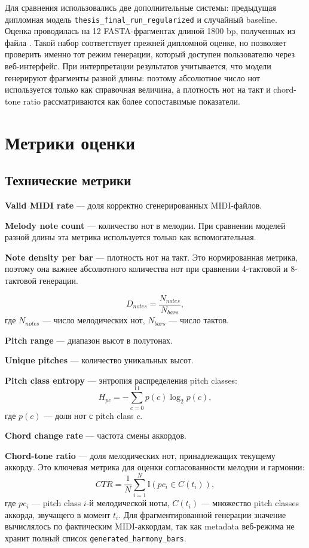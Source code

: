 Для сравнения использовались две дополнительные системы: предыдущая дипломная модель \texttt{thesis\_final\_run\_regularized} и случайный baseline. Оценка проводилась на 12 FASTA-фрагментах длиной 1800 bp, полученных из файла . Такой набор соответствует прежней дипломной оценке, но позволяет проверить именно тот режим генерации, который доступен пользователю через веб-интерфейс. При интерпретации результатов учитывается, что модели генерируют фрагменты разной длины: поэтому абсолютное число нот используется только как справочная величина, а плотность нот на такт и chord-tone ratio рассматриваются как более сопоставимые показатели.

\section{Метрики оценки}

\subsection{Технические метрики}

\textbf{Valid MIDI rate} — доля корректно сгенерированных MIDI-файлов.

\textbf{Melody note count} — количество нот в мелодии. При сравнении моделей разной длины эта метрика используется только как вспомогательная.

\textbf{Note density per bar} — плотность нот на такт. Это нормированная метрика, поэтому она важнее абсолютного количества нот при сравнении 4-тактовой и 8-тактовой генерации.

\begin{equation}
D_{notes} = \frac{N_{notes}}{N_{bars}},
\end{equation}
где \(N_{notes}\) — число мелодических нот, \(N_{bars}\) — число тактов.

\textbf{Pitch range} — диапазон высот в полутонах.

\textbf{Unique pitches} — количество уникальных высот.

\textbf{Pitch class entropy} — энтропия распределения pitch classes:
\begin{equation}
H_{pc} = - \sum_{c=0}^{11} p(c)\log_2 p(c),
\end{equation}
где \(p(c)\) — доля нот с pitch class \(c\).

\textbf{Chord change rate} — частота смены аккордов.

\textbf{Chord-tone ratio} — доля мелодических нот, принадлежащих текущему аккорду. Это ключевая метрика для оценки согласованности мелодии и гармонии:
\begin{equation}
CTR = \frac{1}{N}\sum_{i=1}^{N}
\mathbb{I}\left(pc_i \in C(t_i)\right),
\end{equation}
где \(pc_i\) — pitch class \(i\)-й мелодической ноты, \(C(t_i)\) — множество pitch classes аккорда, звучащего в момент \(t_i\). Для фрагментированной генерации значение вычислялось по фактическим MIDI-аккордам, так как metadata веб-режима не хранит полный список \texttt{generated\_harmony\_bars}.

